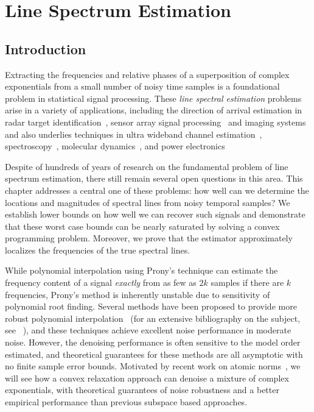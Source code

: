 \chapter{Line Spectrum Estimation}
\label{chap:linespect}

\section{Introduction}

Extracting the frequencies and relative phases of a superposition of complex
exponentials from a small number of noisy time samples is a foundational problem
in statistical signal processing. These \emph{line spectral estimation} problems
arise in a variety of applications, including the direction of arrival
estimation in radar target identification~\cite{radar}, sensor array signal
processing~\cite{arrays} and imaging systems~\cite{imaging} and also underlies
techniques in ultra wideband channel estimation~\cite{uwb},
spectroscopy~\cite{nmr}, molecular dynamics~\cite{andrade2012}, and power
electronics~\cite{power}


Despite of hundreds of years of research on the fundamental problem of line
spectrum estimation, there still remain several open questions in this area.
This chapter addresses a central one of these problems: how well can we
determine the locations and magnitudes of spectral lines from noisy temporal
samples? We establish lower bounds on how well we can recover such signals and
demonstrate that these worst case bounds can be nearly saturated by solving a
convex programming problem. Moreover, we prove that the estimator approximately
localizes the frequencies of the true spectral lines.

While polynomial interpolation using Prony's technique can estimate the
frequency content of a signal \emph{exactly} from as few as $2k$ samples if
there are $k$ frequencies, Prony's method is inherently unstable due to
sensitivity of polynomial root finding. Several methods have been proposed to
provide more robust polynomial interpolation~\cite{music,esprit,hua02} (for an
extensive bibliography on the subject, see ~\cite{stoica93}), and these
techniques achieve excellent noise performance in moderate noise. However, the
denoising performance is often sensitive to the model order estimated, and
theoretical guarantees for these methods are all asymptotic with no finite
sample error bounds. Motivated by recent work on atomic norms~\cite{crpw}, we
will see how a convex relaxation approach can denoise a mixture of complex
exponentials, with theoretical guarantees of noise robustness and a better
empirical performance than previous subspace based approaches.

